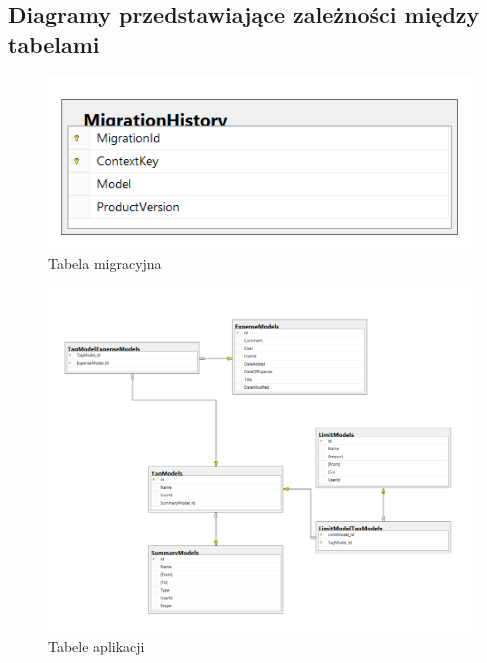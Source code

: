 \documentclass[10pt,titlepage]{article}
\begin{document}
\subsection{Diagramy przedstawiające zależności między tabelami}
\begin{figure}[H]
  \centering
  \includegraphics[scale=0.5]{images/db2.png}
  \caption{Tabela migracyjna}
\end{figure}
\begin{figure}[H]
  \centering
  \includegraphics[scale=0.5]{images/db1.png}
  \caption{Tabele aplikacji}
\end{figure}
\end{document}
